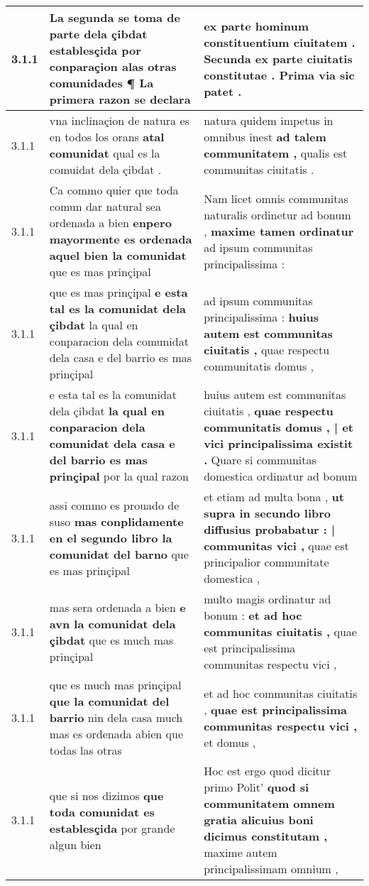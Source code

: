 \begin{tabular}{|p{1cm}|p{6.5cm}|p{6.5cm}|}
3.1.1 & La segunda se toma de parte dela çibdat establesçida \textbf{ por conparaçion alas otras comunidades ¶ } La primera razon se declara & ex parte hominum constituentium ciuitatem . \textbf{ Secunda ex parte ciuitatis constitutae . } Prima via sic patet . \\\hline
3.1.1 & vna inclinaçion de natura es en todos los orans \textbf{ atal comunidat } qual es la comuidat dela çibdat . & natura quidem impetus in omnibus inest \textbf{ ad talem communitatem , } qualis est communitas ciuitatis . \\\hline
3.1.1 & Ca commo quier que toda comun dar natural sea ordenada a bien \textbf{ enpero mayormente es ordenada aquel bien la comunidat } que es mas prinçipal & Nam licet omnis communitas naturalis ordinetur ad bonum , \textbf{ maxime tamen ordinatur } ad ipsum communitas principalissima : \\\hline
3.1.1 & que es mas prinçipal \textbf{ e esta tal es la comunidat dela çibdat } la qual en conparacion dela comunidat dela casa e del barrio es mas prinçipal & ad ipsum communitas principalissima : \textbf{ huius autem est communitas ciuitatis , } quae respectu communitatis domus , \\\hline
3.1.1 & e esta tal es la comunidat dela çibdat \textbf{ la qual en conparacion dela comunidat dela casa e del barrio es mas prinçipal } por la qual razon & huius autem est communitas ciuitatis , \textbf{ quae respectu communitatis domus , | et vici principalissima existit . } Quare si communitas domestica ordinatur ad bonum \\\hline
3.1.1 & assi commo es prouado de suso \textbf{ mas conplidamente en el segundo libro la comunidat del barno } que es mas prinçipal & et etiam ad multa bona , \textbf{ ut supra in secundo libro diffusius probabatur : | communitas vici , } quae est principalior communitate domestica , \\\hline
3.1.1 & mas sera ordenada a bien \textbf{ e avn la comunidat dela çibdat } que es much mas prinçipal & multo magis ordinatur ad bonum : \textbf{ et ad hoc communitas ciuitatis , } quae est principalissima communitas respectu vici , \\\hline
3.1.1 & que es much mas prinçipal \textbf{ que la comunidat del barrio } nin dela casa much mas es ordenada abien que todas las otras & et ad hoc communitas ciuitatis , \textbf{ quae est principalissima communitas respectu vici , } et domus , \\\hline
3.1.1 & que si nos dizimos \textbf{ que toda comunidat es establesçida } por grande algun bien & Hoc est ergo quod dicitur primo Polit’ \textbf{ quod si communitatem omnem gratia alicuius boni dicimus constitutam , } maxime autem principalissimam omnium , \\\hline

\end{tabular}
